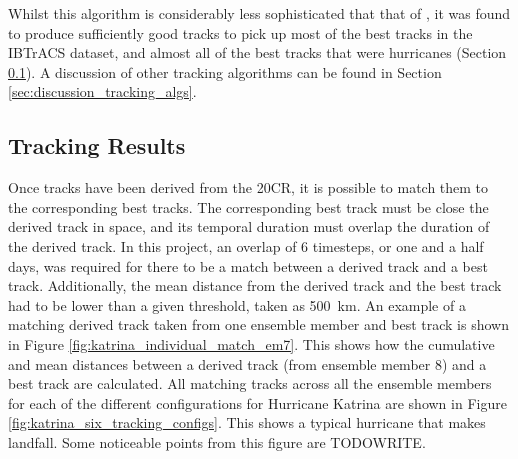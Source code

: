 \documentclass[pdftex,12pt,a4paper]{report}
\begin{document}
Whilst this algorithm is considerably less sophisticated that that of \textcite{hodges1994general},
it was found to produce sufficiently good tracks to pick up most of the best tracks in the IBTrACS
dataset, and almost all of the best tracks that were hurricanes (Section
\ref{sec:results_tracking}). A discussion of other tracking algorithms can be found in Section
\ref{sec:discussion_tracking_algs}.

\subsection{Tracking Results}
\label{sec:results_tracking}

Once tracks have been derived from the 20CR, it is possible to match them to the corresponding best
tracks. The corresponding best track must be close the derived track in space, and its temporal
duration must overlap the duration of the derived track. In this project, an overlap of 6 timesteps,
or one and a half days, was required for there to be a match between a derived track and a best
track. Additionally, the mean distance from the derived track and the best track had to be lower
than a given threshold, taken as \SI{500}{km}. An example of a matching derived track taken from
one ensemble member and best track is shown in Figure \ref{fig:katrina_individual_match_em7}.
This shows how the cumulative and mean distances between a derived track (from ensemble member 8)
and a best track are calculated. All matching tracks across all the ensemble members for each of the
different configurations for Hurricane Katrina are shown in Figure
\ref{fig:katrina_six_tracking_configs}. This shows a typical hurricane that makes landfall. Some
noticeable points from this figure are TODOWRITE.
\end{document}
